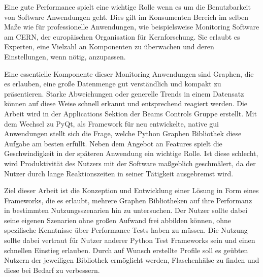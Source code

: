 

\Abstract

Eine gute Performance spielt eine wichtige Rolle wenn es um die  Benutzbarkeit
von Software Anwendungen geht. Dies gilt im Konsumenten Bereich im selben Maße
wie für professionelle Anwendungen, wie beispielsweise Monitoring Software am
CERN, der europäischen Organisation für Kernforschung. Sie erlaubt es Experten,
eine Vielzahl an Komponenten zu überwachen und deren Einstellungen, wenn nötig,
anzupassen.

Eine essentielle Komponente dieser Monitoring Anwendungen sind Graphen, die es
erlauben, eine große Datenmenge gut verständlich und kompakt zu präsentieren.
Starke Abweichungen oder generelle Trends in einem Datensatz können auf diese
Weise schnell erkannt und entsprechend reagiert werden. Die Arbeit wird in der
Applications Sektion der Beams Controls Gruppe erstellt. Mit dem Wechsel zu
PyQt, als Framework für neu entwickelte, native \gls{gui} Anwendungen stellt
sich die Frage, welche Python Graphen Bibliothek diese Aufgabe am besten
erfüllt. Neben dem Angebot an Features spielt die Geschwindigkeit in der
späteren Anwendung ein wichtige Rolle.  Ist diese schlecht, wird Produktivität
des Nutzers mit der Software maßgeblich geschmälert, da der Nutzer durch lange
Reaktionszeiten in seiner Tätigkeit ausgebremst wird.

Ziel dieser Arbeit ist die Konzeption und Entwicklung einer Lösung in Form eines
Frameworks, die es erlaubt, mehrere Graphen Bibliotheken auf ihre Performanz in
bestimmten Nutzungsszenarien hin zu untersuchen. Der Nutzer sollte dabei seine
eigenen Szenarien ohne großen Aufwand frei abbilden können, ohne spezifische
Kenntnisse über Performance Tests haben zu müssen. Die Nutzung sollte dabei
vertraut für Nutzer anderer Python Test Frameworks sein und einen schnellen
Einstieg erlauben. Durch auf Wunsch erstellte Profile soll es geübten Nutzern
der jeweiligen Bibliothek ermöglicht werden, Flaschenhälse zu finden und diese
bei Bedarf zu verbessern.

